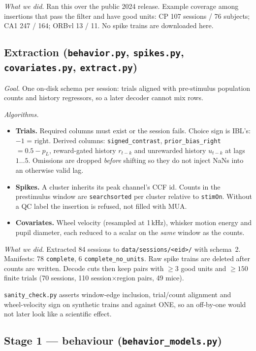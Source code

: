 \documentclass[11pt,a4paper]{article}
\begin{document}
\textit{What we did.} Ran this over the public 2024 release. Example coverage
among insertions that pass the filter and have good units: CP 107 sessions /
76 subjects; CA1 247 / 164; ORBvl 13 / 11. No spike trains are downloaded
here.

\subsection{Extraction (\texttt{behavior.py}, \texttt{spikes.py},
\texttt{covariates.py}, \texttt{extract.py})}

\textit{Goal.} One on-disk schema per session: trials aligned with
pre-stimulus population counts and history regressors, so a later decoder
cannot mix rows.

\textit{Algorithms.}
\begin{itemize}
\item \textbf{Trials.} Required columns must exist or the session fails.
Choice sign is IBL's: $-1$ = right. Derived columns:
\texttt{signed\_contrast}, \texttt{prior\_bias\_right}$=0.5-p_L$,
reward-gated history $r_{t-k}$ and unrewarded history $u_{t-k}$ at lags
$1{\ldots}5$. Omissions are dropped \emph{before} shifting so they do not
inject NaNs into an otherwise valid lag.
\item \textbf{Spikes.} A cluster inherits its peak channel's CCF id. Counts
in the prestimulus window are \texttt{searchsorted} per cluster relative to
\texttt{stimOn}. Without a QC label the insertion is refused, not filled with
MUA.
\item \textbf{Covariates.} Wheel velocity (resampled at 1\,kHz), whisker
motion energy and pupil diameter, each reduced to a scalar on the \emph{same}
window as the counts.
\end{itemize}

\textit{What we did.} Extracted 84 sessions to \texttt{data/sessions/<eid>/}
with schema~2. Manifests: 78 \texttt{complete}, 6 \texttt{complete\_no\_units}.
Raw spike trains are deleted after counts are written. Decode cuts then keep
pairs with $\ge 3$ good units and $\ge 150$ finite trials (70 sessions, 110
session$\times$region pairs, 49 mice).

\texttt{sanity\_check.py} asserts window-edge inclusion, trial/count
alignment and wheel-velocity sign on synthetic trains and against ONE, so an
off-by-one would not later look like a scientific effect.

\subsection{Stage 1 --- behaviour (\texttt{behavior\_models.py})}
\end{document}
